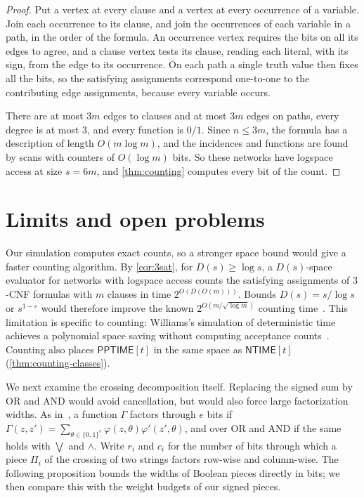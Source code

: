 \documentclass[11pt]{article}
\theoremstyle{definition}
\theoremstyle{definition}
\theoremstyle{remark}
\newcommand{\NTIME}{\mathsf{NTIME}}
\newcommand{\PPTIME}{\mathsf{PPTIME}}
\begin{document}
\begin{proof}
Put a vertex at every clause and a vertex at every occurrence of a variable. Join each occurrence to its clause, and join the occurrences of each variable in a path, in the order of the formula. An occurrence vertex requires the bits on all its edges to agree, and a clause vertex tests its clause, reading each literal, with its sign, from the edge to its occurrence. On each path a single truth value then fixes all the bits, so the satisfying assignments correspond one-to-one to the contributing edge assignments, because every variable occurs.

There are at most $3m$ edges to clauses and at most $3m$ edges on paths, every degree is at most $3$, and every function is $0/1$. Since $n\le3m$, the formula has a description of length $O(m\log m)$, and the incidences and functions are found by scans with counters of $O(\log m)$ bits. So these networks have logspace access at size $s=6m$, and \cref{thm:counting} computes every bit of the count.
\end{proof}

\section{Limits and open problems}\label{sec:discussion}

Our simulation computes exact counts, so a stronger space bound would give a faster counting algorithm. By \cref{cor:3sat}, for $D(s)\ge\log s$, a $D(s)$-space evaluator for networks with logspace access counts the satisfying assignments of $3$-CNF formulas with $m$ clauses in time $2^{O(D(O(m)))}$. Bounds $D(s)=s/\log s$ or $s^{1-\varepsilon}$ would therefore improve the known $2^{O(m/\sqrt{\log m})}$ counting time~\cite{Ope26,Ant26}. This limitation is specific to counting: Williams's simulation of deterministic time achieves a polynomial space saving without computing acceptance counts~\cite{Wil25}. Counting also places $\PPTIME[t]$ in the same space as $\NTIME[t]$ (\cref{thm:counting-classes}).

We next examine the crossing decomposition itself. Replacing the signed sum by OR and AND would avoid cancellation, but would also force large factorization widths. As in~\cite{Ant26}, a function $\Gamma$ factors through $e$ bits if $\Gamma(z,z')=\sum_{\theta\in\{0,1\}^e}\varphi(z,\theta)\varphi'(z',\theta)$, and over OR and AND if the same holds with $\bigvee$ and $\wedge$. Write $r_i$ and $c_i$ for the number of bits through which a piece $\Pi_i$ of the crossing of two strings factors row-wise and column-wise. The following proposition bounds the widths of Boolean pieces directly in bits; we then compare this with the weight budgets of our signed pieces.
\end{document}
